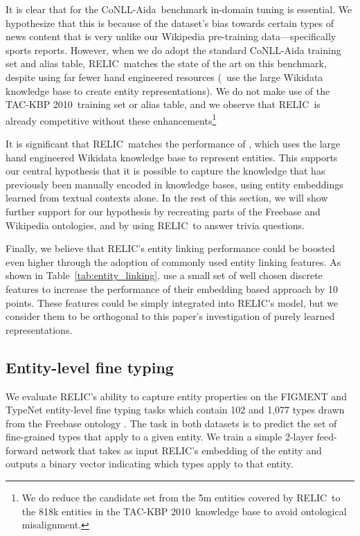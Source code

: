 \documentclass{article} \usepackage{iclr2020_conference,times}
\newcommand{\ack}{RELIC\xspace}
\newcommand{\tac}{TAC-KBP 2010}
\newcommand{\conll}{CoNLL-Aida}
\begin{document}
It is clear that for the \conll~benchmark in-domain tuning is essential.
We hypothesize that this is because of the dataset's bias towards certain types of news content that is very unlike our Wikipedia pre-training data---specifically sports reports. However, when we do adopt the standard CoNLL-Aida training set and alias table, \ack~matches the state of the art on this benchmark, despite using far fewer hand engineered resources (\cite{Raiman2018-hm}~use the large Wikidata knowledge base to create entity representations).
We do not make use of the \tac~training set or alias table, and we observe that \ack~is already competitive without these enhancements\footnote{We do reduce the candidate set from the 5m entities covered by \ack~to the 818k entities in the \tac~knowledge base to avoid ontological misalignment.}

It is significant that \ack~matches the performance of \cite{Raiman2018-hm}, which uses the large hand engineered Wikidata knowledge base to represent entities.
This supports our central hypothesis that it is possible to capture the knowledge that has previously been manually encoded in knowledge bases, using entity embeddings learned from textual contexts alone. In the rest of this section, we will show further support for our hypothesis by recreating parts of the Freebase and Wikipedia ontologies, and by using \ack~to answer trivia questions.

Finally, we believe that \ack's entity linking performance could be boosted even higher through the adoption of commonly used entity linking features.
As shown in Table~\ref{tab:entity_linking}, \cite{yamada2016joint} use a small set of well chosen discrete features to increase the performance of their embedding based approach by 10 points.
These features could be simply integrated into \ack's model, but we consider them to be orthogonal to this paper's investigation of purely learned representations.





\subsection{Entity-level fine typing} \label{sec:entity_typing_results}


We evaluate \ack's ability to capture entity properties on the FIGMENT \citep{yaghoobzadeh2015corpus} and TypeNet \citep{murty2018hierarchical} entity-level fine typing tasks which contain 102 and 1,077 types drawn from the Freebase ontology \citep{bollacker2008freebase}.
The task in both datasets is to predict the set of fine-grained types that apply to a given entity. We train a simple 2-layer feed-forward network that takes as input \ack's embedding  of the entity  and outputs a binary vector indicating which types apply to that entity.
\end{document}
